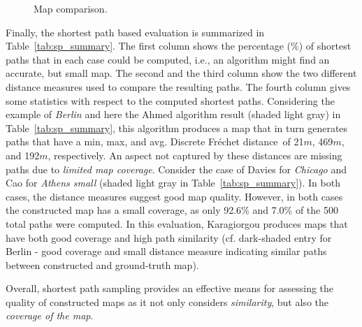 \documentclass[natbib]{svjour3}                    \smartqed  \usepackage[table]{xcolor}
\newcommand{\Frd}{Fr\'echet distance}
\begin{document}
\begin{figure}[htbp]
 \begin{center}
\hspace{0.05cm}	 
 \end{center}
\caption{Map comparison.}
\end{figure}

Finally, the shortest path based evaluation is summarized in Table~\ref{tab:sp_summary}. The first column shows the percentage ($\%$) of shortest paths that in each case could be computed, i.e., an algorithm might find an accurate, but small map. The second and the third column show the two different distance measures used to compare the resulting paths. The fourth column gives some statistics with respect to the computed shortest paths.
Considering the example of \emph{Berlin} and here the Ahmed algorithm result (shaded light gray) in Table~\ref{tab:sp_summary}, this algorithm produces a map that in turn generates paths that have a min, max, and avg. Discrete \Frd\ of 21$m$, 469$m$, and 192$m$, respectively. 
An aspect not captured by these distances are missing paths due to \emph{limited map coverage}. Consider the case of Davies for \emph{Chicago} and Cao for \emph{Athens small} (shaded light gray in Table~\ref{tab:sp_summary}). In both cases, the distance measures suggest good map quality. However, in both cases the constructed map has a small coverage, as only 92.6$\%$ and 7.0$\%$ of the 500 total paths were computed. In this evaluation, Karagiorgou produces maps that have both good coverage and high path similarity (cf. dark-shaded entry for Berlin - good coverage and small distance measure indicating similar paths between constructed and ground-truth map).


Overall, shortest path sampling provides an effective means for assessing the quality of constructed maps as it not only considers \emph{similarity}, but also the \emph{coverage of the map}.
\end{document}
